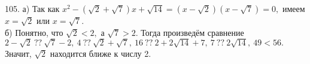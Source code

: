105. а) Так как $x^2-(\sqrt{2}+\sqrt{7})x+\sqrt{14}=(x-\sqrt{2})(x-\sqrt{7})=0,$ имеем $x=\sqrt{2}$ или $x=\sqrt{7}.$\\
б) Понятно, что $\sqrt{2}<2,$ а $\sqrt{7}>2.$ Тогда произведём сравнение $2-\sqrt{2}\ ??\ \sqrt{7}-2,\ 4\ ??\ \sqrt{2}+\sqrt{7},\ 16\ ??\ 2+2\sqrt{14}+7,\ 7\ ??\ 2\sqrt{14},\ 49<56.$ Значит, $\sqrt{2}$ находится ближе к числу 2.\\
